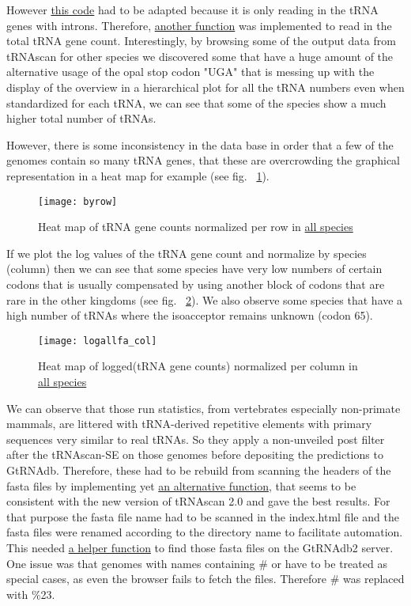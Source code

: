 However \hyperlink{function:readintronic}{this code} had to be adapted because it is only reading in the tRNA genes with introns. Therefore, \hyperlink{function:readstats}{another function} was implemented to read in the total tRNA gene count. Interestingly, by browsing some of the output data from tRNAscan for other species we discovered some that have a huge amount of the alternative usage of the opal stop codon "UGA" that is messing up with the display of the overview in a hierarchical plot for all the tRNA numbers even when standardized for each tRNA, we can see that some of the species show a much higher total number of tRNAs. 

However, there is some inconsistency in the data base in order that a few of the genomes contain so many tRNA genes, that these are overcrowding the graphical representation in a heat map for example (see fig. ~\ref{fig:byrow}).

\begin{figure}[tb] 
\centering 
\texttt{[image: byrow]} 
\caption[Heat map for tRNA counts]{Heat map of tRNA gene counts normalized per row in \hyperlink{data:veab}{all species}}
\label{fig:byrow} 
\end{figure}

If we plot the log values of the tRNA gene count and normalize by species (column) then we can see that some species have very low numbers of certain codons that is usually compensated by using another block of codons that are rare in the other kingdoms  (see fig. ~\ref{fig:bycol}). We also observe some species that have a high number of tRNAs where the isoacceptor remains unknown (codon 65). \\

\begin{figure}[tb] 
\centering 
\texttt{[image: logallfa\_col]} 
\caption[Heat map for log(tRNA counts)]{Heat map of logged(tRNA gene counts) normalized per column in \hyperlink{data:veab}{all species}}
\label{fig:bycol} 
\end{figure}

We can observe that those run statistics, from vertebrates especially non-primate mammals, are littered with tRNA-derived repetitive elements with primary sequences very similar to real tRNAs. So they apply a non-unveiled post filter after the tRNAscan-SE on those genomes before depositing the predictions to GtRNAdb. Therefore, these had to be rebuild from scanning the headers of the fasta files by implementing yet \hyperlink{function:readfasta}{an alternative function}, that seems to be consistent with the new version of tRNAscan 2.0 and gave the best results. For that purpose the fasta file name had to be scanned in the index.html file and the fasta files were renamed according to the directory name to facilitate automation. This needed \hyperlink{function:searchfafile}{a helper function} to find those fasta files on the GtRNAdb2 server. One issue was that genomes with names containing \# or \* have to be treated as special cases, as even the browser fails to fetch the files. Therefore \# was replaced with \%23. \\

